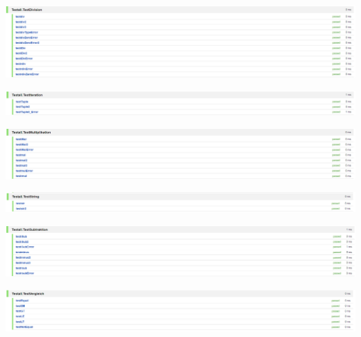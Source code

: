 \begin{minipage}{\linewidth}
	\centering
	\includegraphics[width=1.1\linewidth]{images/testDivision}
\end{minipage}

\begin{minipage}{\linewidth}
	\centering
	\includegraphics[width=1.1\linewidth]{images/testIteration}
\end{minipage}

\begin{minipage}{\linewidth}
	\centering
	\includegraphics[width=1.1\linewidth]{images/testMultiplikation}
\end{minipage}

\begin{minipage}{\linewidth}
	\centering
	\includegraphics[width=1.1\linewidth]{images/testString}
\end{minipage}

\begin{minipage}{\linewidth}
	\centering
	\includegraphics[width=1.1\linewidth]{images/testSubtraktion}
\end{minipage}

\begin{minipage}{\linewidth}
	\centering
	\includegraphics[width=1.1\linewidth]{images/testVergleich}
\end{minipage}


